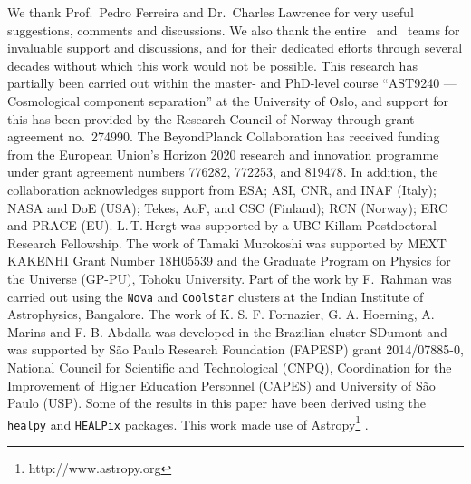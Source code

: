\begin{acknowledgements}
  We thank Prof.\ Pedro Ferreira and Dr.\ Charles Lawrence for very
  useful suggestions, comments and discussions.  We also thank the
  entire \Planck\ and \WMAP\ teams for invaluable support and
  discussions, and for their dedicated efforts through several decades
  without which this work would not be possible. This research has
  partially been carried out within the master- and PhD-level course
  ``AST9240 --- Cosmological component separation'' at the University
  of Oslo, and support for this has been provided by the Research
  Council of Norway through grant agreement no.\ 274990. The
  BeyondPlanck Collaboration has received funding from the European
  Union’s Horizon 2020 research and innovation programme under grant
  agreement numbers 776282, 772253, and 819478. In addition, the
  collaboration acknowledges support from ESA; ASI, CNR, and INAF
  (Italy); NASA and DoE (USA); Tekes, AoF, and CSC (Finland); RCN
  (Norway); ERC and PRACE (EU).  L.\,T.\,Hergt was supported by a UBC
  Killam Postdoctoral Research Fellowship.  The work of Tamaki
  Murokoshi was supported by MEXT KAKENHI Grant Number 18H05539 and
  the Graduate Program on Physics for the Universe (GP-PU), Tohoku
  University.  Part of the work by F.\, Rahman was carried out using
  the \texttt{Nova} and \texttt{Coolstar} clusters at the Indian
  Institute of Astrophysics, Bangalore.  The work of
  K. S. F. Fornazier, G. A. Hoerning, A. Marins and F. B. Abdalla was
  developed in the Brazilian cluster SDumont and was supported by
  S\~ao Paulo Research Foundation (FAPESP) grant 2014/07885-0,
  National Council for Scientific and Technological (CNPQ),
  Coordination for the Improvement of Higher Education Personnel
  (CAPES) and University of S\~ao Paulo (USP).  Some of the results in
  this paper have been derived using the \texttt{healpy}
  \citep{zonca2019} and \texttt{HEALPix} \citep{gorski2005} packages.
  This work made use of Astropy\footnote{http://www.astropy.org}
  \citep{astropy:2013, astropy:2018, astropy:2022}.
\end{acknowledgements}
